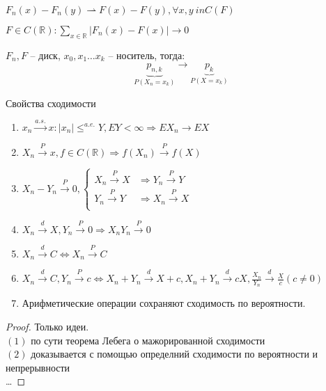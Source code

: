 \documentclass{article}
\begin{document}
    \begin{remark}
        $F_n(x) - F_n(y)  \rightharpoonup F(x) - F(y), \forall x, y \ in C(F)$
    \end{remark}
    \begin{remark}
        $F\in C(\mathbb{R}): \sum\limits_{x\in\mathbb{R}} |F_n(x) -F(x)| \to 0$
    \end{remark}
    \begin{remark}
        $F_n, F $ -- диск, ${x_0, x_1 \dots x_k}$ --  носитель, тогда:
        $$ \underbrace{p_{n, k}}_{P(X_n=x_k)} \to \underbrace{p_k}_{P(X=x_k)}$$
    \end{remark}
    \begin{theorem}{Свойства сходимости}
        \begin{enumerate}
            \item $x_n \xrightarrow{a.s.} x: |x_n| \le^{a.e.} Y, EY < \infty \Rightarrow EX_n \to EX$ 
            \item $X_n \xrightarrow{P} x, f\in C(\mathbb{R}) \Rightarrow f(X_n) \xrightarrow{P} f(X)$
            \item $X_n - Y_n \xrightarrow{P} 0, \begin{cases}
                X_n \xrightarrow{P} X &\Rightarrow Y_n \xrightarrow{P} Y\\
                Y_n \xrightarrow{P} Y &\Rightarrow X_n \xrightarrow{P} X\\
            \end{cases}
            $
            \item $X_n \xrightarrow{d} X, Y_n \xrightarrow{P} 0 \Rightarrow X_n Y_n \xrightarrow{P} 0$
            \item $X_n \xrightarrow{d} C \Leftrightarrow X_n \xrightarrow{P} C$
            \item $X_n \xrightarrow{d} C, Y_n \xrightarrow{P} c \Leftrightarrow X_n + Y_n \xrightarrow{d} X + c, X_n + Y_n \xrightarrow{d} cX, \frac{X_n}{Y_n} \xrightarrow{d} \frac{X}{c} (c \ne 0)$
            \item Арифметические операции сохраняют сходимость по вероятности.
        \end{enumerate}
        \begin{proof}
            Только идеи.\\
            $(1)$ по сути теорема Лебега о мажорированной сходимости\\
            $(2)$ доказывается с помощью определний сходимости по вероятности и непрерывности \\
            \dots
        \end{proof}
    \end{theorem}
\end{document}
